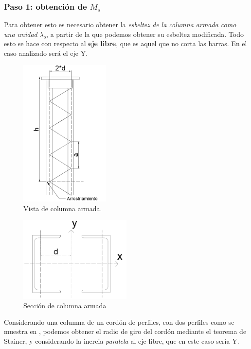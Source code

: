 \documentclass[../main.tex]{subfiles}
\begin{document}
\subsubsection{Paso 1: obtención de $M_s$}

Para obtener esto es necesario obtener la \textit{esbeltez de la columna armada
como una unidad} $\lambda_o$, a partir de la que podemos obtener su esbeltez 
modificada. Todo esto se hace con respecto al \textbf{eje libre}, que es aquel
que no corta las barras. En el caso analizado será el eje Y.

\begin{figure}[htpb]
  \centering
  \includegraphics[width=0.4\textwidth]{../images/resumen/armada}
  \caption{Vista de columna armada.}
  \label{fig:armada}
\end{figure}

\begin{figure}[htpb]
  \centering
  \includegraphics[width=0.5\textwidth]{../images/resumen/armada_trans}
  \caption{Sección de columna armada}
  \label{fig:armada_trans}
\end{figure}

Considerando una columna de un cordón de perfiles, con dos perfiles como se 
muestra en , podemos obtener el radio de giro del cordón
mediante el teorema de Stainer, y considerando la inercia \textit{paralela} al
eje libre, que en este caso sería Y.
\end{document}
